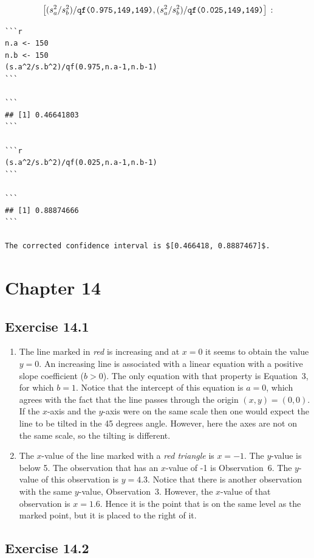 \documentclass[]{krantz}
\theoremstyle{definition}
\theoremstyle{definition}
\theoremstyle{definition}
\theoremstyle{remark}
\begin{document}
\[\big[(s_a^2/s_b^2)/\mbox{\texttt{qf(0.975,149,149)}} , (s_a^2/s_b^2)/\mbox{\texttt{qf(0.025,149,149)}}\big]\,:\]

\begin{verbatim}
```r
n.a <- 150
n.b <- 150
(s.a^2/s.b^2)/qf(0.975,n.a-1,n.b-1)
```

```
## [1] 0.46641803
```

```r
(s.a^2/s.b^2)/qf(0.025,n.a-1,n.b-1)
```

```
## [1] 0.88874666
```

The corrected confidence interval is $[0.466418, 0.8887467]$.
\end{verbatim}

\section*{Chapter 14}\label{chapter-14}


\subsection*{Exercise 14.1}\label{exercise-14.1}


\begin{enumerate}
\def\labelenumi{\arabic{enumi}.}
\item
  The line marked in \emph{red} is increasing and at \(x=0\) it seems to
  obtain the value \(y=0\). An increasing line is associated with a
  linear equation with a positive slope coefficient (\(b > 0\)). The
  only equation with that property is Equation~3, for which \(b=1\).
  Notice that the intercept of this equation is \(a = 0\), which agrees
  with the fact that the line passes through the origin
  \((x,y) = (0,0)\). If the \(x\)-axis and the \(y\)-axis were on the
  same scale then one would expect the line to be tilted in the 45
  degrees angle. However, here the axes are not on the same scale, so
  the tilting is different.
\item
  The \(x\)-value of the line marked with a \emph{red triangle} is
  \(x=-1\). The \(y\)-value is below 5. The observation that has an
  \(x\)-value of -1 is Observation~6. The \(y\)-value of this
  observation is \(y=4.3\). Notice that there is another observation
  with the same \(y\)-value, Observation~3. However, the \(x\)-value of
  that observation is \(x=1.6\). Hence it is the point that is on the
  same level as the marked point, but it is placed to the right of it.
\end{enumerate}

\subsection*{Exercise 14.2}\label{exercise-14.2}
\end{document}
